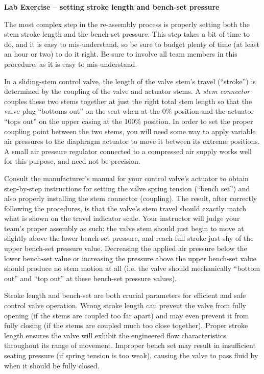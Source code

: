 \begin{itemize}
\vfil \eject

\noindent
{\bf Lab Exercise -- setting stroke length and bench-set pressure}

\vskip 5pt

The most complex step in the re-assembly process is properly setting both the stem stroke length and the bench-set pressure.  This step takes a bit of time to do, and it is easy to mis-understand, so be sure to budget plenty of time (at least an hour or two) to do it right.  Be sure to involve all team members in this procedure, as it is easy to mis-understand.

In a sliding-stem control valve, the length of the valve stem's travel (``stroke'') is determined by the coupling of the valve and actuator stems.  A {\it stem connector} couples these two stems together at just the right total stem length so that the valve plug ``bottoms out'' on the seat when at the 0\% position and the actuator ``tops out'' on the upper casing at the 100\% position.  In order to set the proper coupling point between the two stems, you will need some way to apply variable air pressures to the diaphragm actuator to move it between its extreme positions.  A small air pressure regulator connected to a compressed air supply works well for this purpose, and need not be precision.

\vskip 10pt

Consult the manufacturer's manual for your control valve's actuator to obtain step-by-step instructions for setting the valve spring tension (``bench set'') and also properly installing the stem connector (coupling).  The result, after correctly following the procedures, is that the valve's stem travel should exactly match what is shown on the travel indicator scale.  Your instructor will judge your team's proper assembly as such: the valve stem should just begin to move at slightly above the lower bench-set pressure, and reach full stroke just shy of the upper bench-set pressure value.  Decreasing the applied air pressure below the lower bench-set value or increasing the pressure above the upper bench-set value should produce no stem motion at all (i.e. the valve should mechanically ``bottom out'' and ``top out'' at these bench-set pressure values).

\vskip 10pt

Stroke length and bench-set are both crucial parameters for efficient and safe control valve operation.  Wrong stroke length can prevent the valve from fully opening (if the stems are coupled too far apart) and may even prevent it from fully closing (if the stems are coupled much too close together).  Proper stroke length ensures the valve will exhibit the engineered flow characteristics throughout its range of movement.  Improper bench set may result in insufficient seating pressure (if spring tension is too weak), causing the valve to pass fluid by when it should be fully closed.


\end{itemize}

